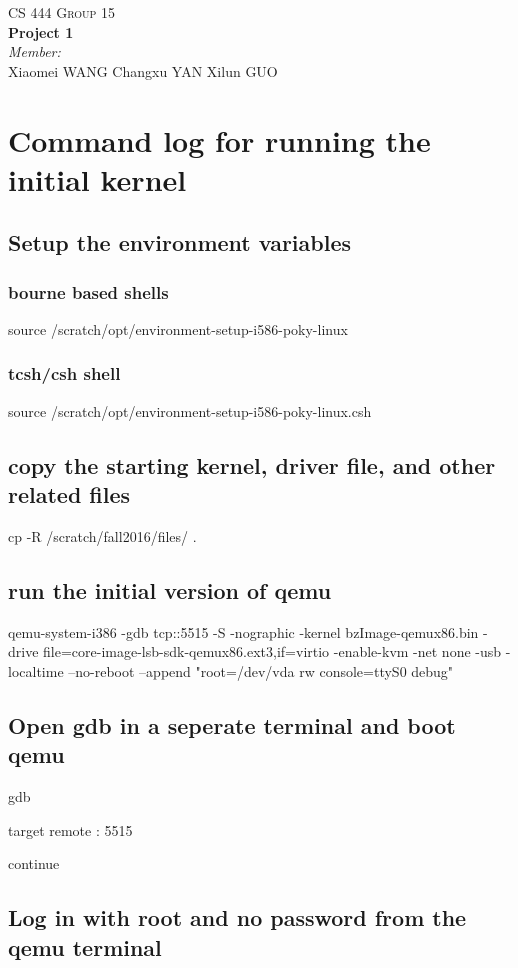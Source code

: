 \documentclass[letterpaper,10pt]{article}
\begin{document}
\begin{center}
    \textsc{\LARGE CS 444 Group 15}\\
    { \huge \bfseries Project 1 \\}
    \emph{Member:}\\
    Xiaomei \textsc{WANG}
    Changxu \textsc{YAN}
    Xilun \textsc{GUO}
\end{center}
\newpage

\section{Command log for running the initial kernel}
\subsection{Setup the environment variables}
\subsubsection{bourne based shells}
source /scratch/opt/environment-setup-i586-poky-linux
\subsubsection{tcsh/csh shell}
source /scratch/opt/environment-setup-i586-poky-linux.csh
\subsection{copy the starting kernel, driver file, and other related files}
cp -R /scratch/fall2016/files/ .
\subsection{run the initial version of qemu}
qemu-system-i386 -gdb tcp::5515 -S -nographic -kernel bzImage-qemux86.bin -drive file=core-image-lsb-sdk-qemux86.ext3,if=virtio -enable-kvm -net none -usb -localtime --no-reboot --append "root=/dev/vda rw console=ttyS0 debug"
\subsection{Open gdb in a seperate terminal and boot qemu}
gdb

target remote : 5515

continue
\subsection{Log in with root and no password from the qemu terminal}
\end{document}
